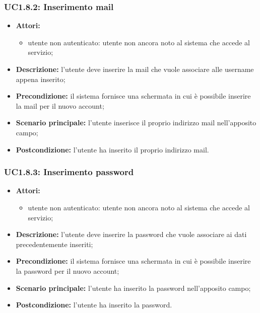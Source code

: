 \subsubsection{UC1.8.2: Inserimento mail}
\begin{itemize}
	\item \textbf{Attori:}
	\begin{itemize}
		\item utente non autenticato: utente non ancora noto al sistema che accede al servizio;
	\end{itemize}
	\item \textbf{Descrizione:} l'utente deve inserire la mail che vuole associare alle username appena inserito;
	\item \textbf{Precondizione:} il sistema fornisce una schermata in cui è possibile inserire la mail per il nuovo account;
	\item \textbf{Scenario principale:} l'utente inserisce il proprio indirizzo mail nell'apposito campo;
	\item \textbf{Postcondizione:} l'utente ha inserito il proprio indirizzo mail.
\end{itemize}

\subsubsection{UC1.8.3: Inserimento password}
\begin{itemize}
	\item \textbf{Attori:}
	\begin{itemize}
		\item utente non autenticato: utente non ancora noto al sistema che accede al servizio;
	\end{itemize}
	\item \textbf{Descrizione:} l'utente deve inserire la password che vuole associare ai dati precedentemente inseriti;
	\item \textbf{Precondizione:} il sistema fornisce una schermata in cui è possibile inserire la password per il nuovo account;
	\item \textbf{Scenario principale:} l'utente ha inserito la password nell'apposito campo;
	\item \textbf{Postcondizione:} l'utente ha inserito la password.
\end{itemize}

